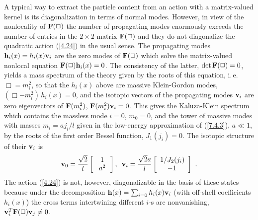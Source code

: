 \documentclass[a4paper,prl,twocolumn,amsmath,amssymb,showpacs]{revtex4}
\begin{document}
A typical way to extract the particle content from an action with a 
matrix-valued kernel is its diagonalization in terms of normal modes.  
However, in view of the nonlocality of ${\bf F(\Box)}$ the number of 
propagating modes enormously exceeds the number of entries in the 
$2\times2$-matrix ${\bf F}(\Box)$ and they do not diagonalize the 
quadratic action (\ref{4.24}) in the usual sense. The propagating modes 
${\bf h}_i(x)=h_i(x){\bf v}_i$ are the zero modes of ${\bf F}(\Box)$ 
which solve the matrix-valued nonlocal equation  
${\bf F}(\Box){\bf h}_i(x)=0$. The consistency of the latter,  
$\det{\bf F}(\Box)=0$, yields a mass spectrum of the theory given by 
the roots of this equation, i.\,e.\ $\Box=m_i^2$, so that the $h_i(x)$ above 
are massive Klein-Gordon modes, $(\Box-m_i^2)\,h_i(x)=0$, and the isotopic 
vectors of the propagating modes ${\bf v}_i$ are zero eigenvectors 
of ${\bf F}(m_i^2)$,
${\bf F}(m_i^2){\bf v}_i=0$. This gives
 the Kaluza-Klein 
spectrum which contains the massless mode $i=0$, $m_0=0$, and the 
tower of massive modes with masses $m_i=a j_i/l$ given in the low-energy  
approximation of (\ref{7.4.3}), $a\ll1$, by the roots of the first order  
Bessel function, $J_1(j_i)=0$. The isotopic structure of their  
${\bf v}_i$ is  
    \begin{equation}  
    {\bf v}_0= \frac{\sqrt 2}l 
    \left[\begin{array}{c}  
    \,1 \\  
    \,\,a^2\,  
    \end{array}\right],\,\,\, 
    {\bf v}_i= \frac{{\sqrt 2}a}l 
    \left[\begin{array}{c}  
    1/J_2(j_i) \\  
    -1\,  
    \end{array}\right]\ .  \label{v} 
    \end{equation} 
The action (\ref{4.24}) is not, however, diagonalizable in the basis of these 
states because under the decomposition ${\bf h}(x)=\sum_{i=0}h_i(x){\bf v}_i$ 
(with off-shell coefficients $h_i(x)$) the cross terms intertwining 
different $i$-s are nonvanishing, ${\bf v}_i^T {\bf F}(\Box) {\bf v}_j\neq 0$. 
 
\end{document}
